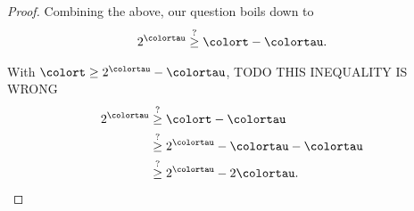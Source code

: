 \begin{proof}
Combining the above, our question boils down to
\begin{align*}
2^{\colortau}
\stackrel{?}{\geq} \colort - \colortau.
\end{align*}

With $\colort \geq 2^{\colortau} - \colortau$, TODO THIS INEQUALITY IS WRONG
\begin{align*}
2^{\colortau}
&\stackrel{?}{\geq} \colort - \colortau \\
&\stackrel{?}{\geq} 2^{\colortau} - \colortau - \colortau \\
&\stackrel{?}{\geq} 2^{\colortau} - 2\colortau.
\end{align*}

\end{proof}
